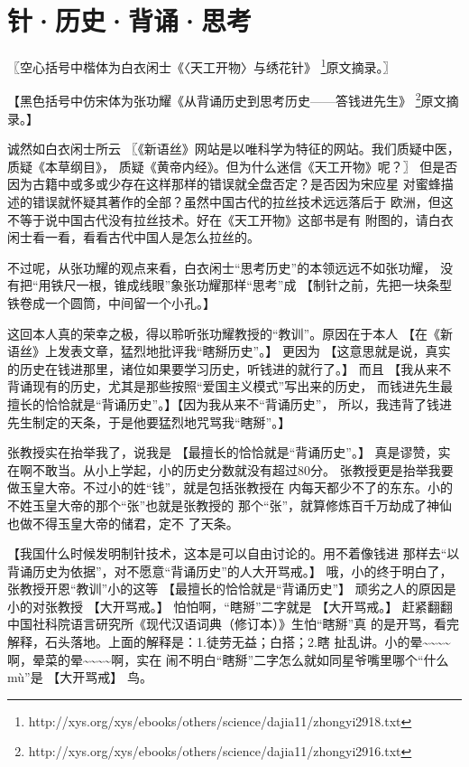 \chapter{针·历史·背诵·思考}

\subtitle{——致白衣闲士兼答张功耀}

\kaishu
〖空心括号中楷体为白衣闲士《〈天工开物〉与绣花针》
\footnote{http://xys.org/xys/ebooks/others/science/dajia11/zhongyi2918.txt}原文摘录。〗

\fangsong
【黑色括号中仿宋体为张功耀《从背诵历史到思考历史——答钱进先生》
\footnote{http://xys.org/xys/ebooks/others/science/dajia11/zhongyi2916.txt}原文摘录。】

\normalfont
诚然如白衣闲士所云
\kaishu
〖《新语丝》网站是以唯科学为特征的网站。我们质疑中医，质疑《本草纲目》，
质疑《黄帝内经》。但为什么迷信《天工开物》呢？〗
\normalfont
但是否因为古籍中或多或少存在这样那样的错误就全盘否定？是否因为宋应星
对蜜蜂描述的错误就怀疑其著作的全部？虽然中国古代的拉丝技术远远落后于
欧洲，但这不等于说中国古代没有拉丝技术。好在《天工开物》这部书是有
附图的，请白衣闲士看一看，看看古代中国人是怎么拉丝的。

不过呢，从张功耀的观点来看，白衣闲士“思考历史”的本领远远不如张功耀，
没有把“用铁尺一根，锥成线眼”象张功耀那样“思考”成
\fangsong
【制针之前，先把一块条型铁卷成一个圆筒，中间留一个小孔。】

\normalfont
这回本人真的荣幸之极，得以聆听张功耀教授的“教训”。原因在于本人
\fangsong
【在《新语丝》上发表文章，猛烈地批评我“瞎掰历史”。】
\normalfont
更因为
\fangsong
【这意思就是说，真实的历史在钱进那里，诸位如果要学习历史，听钱进的就行了。】
\normalfont
而且
\fangsong
【我从来不背诵现有的历史，尤其是那些按照“爱国主义模式”写出来的历史，
而钱进先生最擅长的恰恰就是“背诵历史”。】【因为我从来不“背诵历史”，
所以，我违背了钱进先生制定的天条，于是他要猛烈地咒骂我“瞎掰”。】

\normalfont
张教授实在抬举我了，说我是
\fangsong
【最擅长的恰恰就是“背诵历史”。】
\normalfont
真是谬赞，实在啊不敢当。从小上学起，小的历史分数就没有超过80分。
张教授更是抬举我要做玉皇大帝。不过小的姓“钱”，就是包括张教授在
内每天都少不了的东东。小的不姓玉皇大帝的那个“张”也就是张教授的
那个“张”，就算修炼百千万劫成了神仙也做不得玉皇大帝的储君，定不
了天条。

\fangsong
【我国什么时候发明制针技术，这本是可以自由讨论的。用不着像钱进
那样去“以背诵历史为依据”，对不愿意“背诵历史”的人大开骂戒。】
\normalfont
哦，小的终于明白了，张教授开恩“教训”小的这等
\fangsong
【最擅长的恰恰就是“背诵历史”】
\normalfont
顽劣之人的原因是小的对张教授
\fangsong
【大开骂戒。】
\normalfont
怕怕啊，“瞎掰”二字就是
\fangsong
【大开骂戒。】
\normalfont
赶紧翻翻中国社科院语言研究所《现代汉语词典（修订本）》生怕“瞎掰”真
的是开骂，看完解释，石头落地。上面的解释是：1.徒劳无益；白搭；2.瞎
扯乱讲。小的晕\~{}\~{}\~{}\~{}啊，晕菜的晕\~{}\~{}\~{}\~{}啊，实在
闹不明白“瞎掰”二字怎么就如同星爷嘴里哪个“什么mù”是
\fangsong
【大开骂戒】
\normalfont
鸟。


